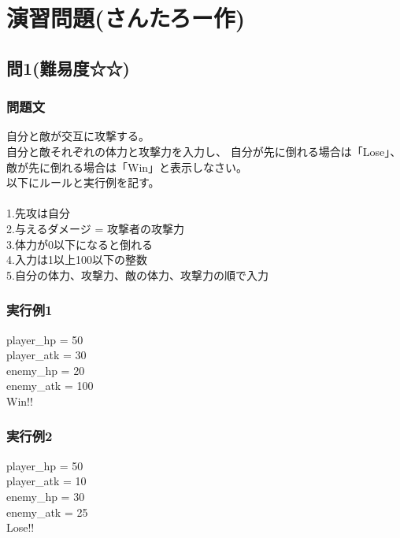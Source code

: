 \section{演習問題(さんたろー作)}
\subsection{問1(難易度☆☆)}
\subsubsection{問題文}
自分と敵が交互に攻撃する。\\
自分と敵それぞれの体力と攻撃力を入力し、
自分が先に倒れる場合は「Lose」、
敵が先に倒れる場合は「Win」と表示しなさい。\\
以下にルールと実行例を記す。\\
\\
1.先攻は自分\\
2.与えるダメージ = 攻撃者の攻撃力\\
3.体力が0以下になると倒れる\\
4.入力は1以上100以下の整数\\
5.自分の体力、攻撃力、敵の体力、攻撃力の順で入力\\

\subsubsection{実行例1}
player_hp = 50\\
player_atk = 30\\
enemy_hp = 20\\
enemy_atk = 100\\
Win!!\\

\subsubsection{実行例2}
player_hp = 50\\
player_atk = 10\\
enemy_hp = 30\\
enemy_atk = 25\\
Lose!!\\
